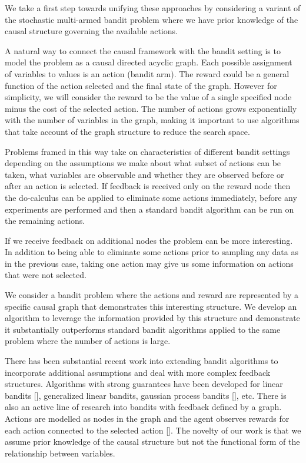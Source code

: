\documentclass{article}
\theoremstyle{plain}
\theoremstyle{definition}
\begin{document}
We take a first step towards unifying these approaches by considering a variant of the stochastic multi-armed bandit problem where we have prior knowledge of the causal structure governing the available actions. 

A natural way to connect the causal framework with the bandit setting is to model the problem as a causal directed acyclic graph. Each possible assignment of variables to values is an action (bandit arm). The reward could be a general function of the action selected and the final state of the graph. However for simplicity, we will consider the reward to be the value of a single specified node minus the cost of the selected action. The number of actions grows exponentially with the number of variables in the graph, making it important to use algorithms that take account of the graph structure to reduce the search space. 

Problems framed in this way take on characteristics of different bandit settings depending on the assumptions we make about what subset of actions can be taken, what variables are observable and whether they are observed before or after an action is selected. If feedback is received only on the reward node then the do-calculus can be applied to eliminate some actions immediately, before any experiments are performed and then a standard bandit algorithm can be run on the remaining actions. 

If we receive feedback on additional nodes the problem can be more interesting. In addition to being able to eliminate some actions prior to sampling any data as in the previous case, taking one action may give us some information on actions that were not selected. 

We consider a bandit problem where the actions and reward are represented by a specific causal graph that demonstrates this interesting structure. We develop an algorithm to leverage the information provided by this structure and demonstrate it substantially outperforms standard bandit algorithms applied to the same problem where the number of actions is large.

There has been substantial recent work into extending bandit algorithms to incorporate additional assumptions and deal with more complex feedback structures. Algorithms with strong guarantees have been developed for linear bandits [], generalized linear bandits, gaussian process bandits [], etc. There is also an active line of research into bandits with feedback defined by a graph. Actions are modelled as nodes in the graph and the agent observes rewards for each action connected to the selected action []. The novelty of our work is that we assume prior knowledge of the causal structure but not the functional form of the relationship between variables.   
\end{document}
